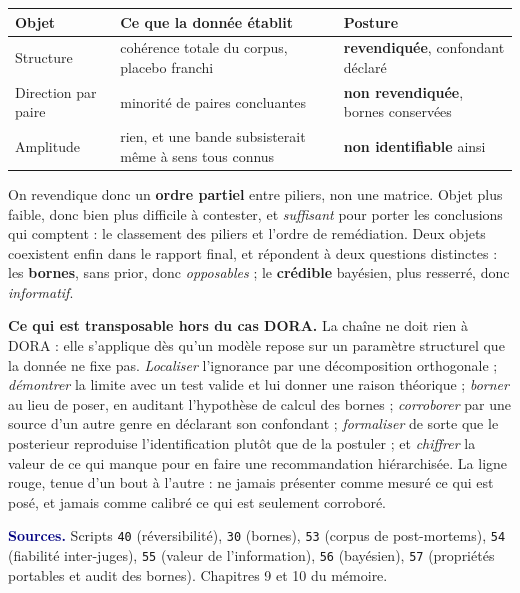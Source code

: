 \documentclass[11pt,a4paper]{article}
\begin{document}
\begin{center}\small
\renewcommand{\arraystretch}{1.25}
\begin{tabular}{@{}p{3.0cm} p{6.9cm} p{4.6cm}@{}}
\toprule
\textbf{Objet} & \textbf{Ce que la donnée établit} & \textbf{Posture} \\
\midrule
Structure & cohérence totale du corpus, placebo franchi & \textbf{revendiquée}, confondant déclaré \\
Direction par paire & minorité de paires concluantes & \textbf{non revendiquée}, bornes conservées \\
Amplitude & rien, et une bande subsisterait même à sens tous connus & \textbf{non identifiable} ainsi \\
\bottomrule
\end{tabular}
\end{center}

\vspace{2pt}
On revendique donc un \textbf{ordre partiel} entre piliers, non une matrice. Objet plus faible,
donc bien plus difficile à contester, et \emph{suffisant} pour porter les conclusions qui
comptent : le classement des piliers et l'ordre de remédiation. Deux objets coexistent enfin dans
le rapport final, et répondent à deux questions distinctes : les \textbf{bornes}, sans prior, donc
\emph{opposables} ; le \textbf{crédible} bayésien, plus resserré, donc \emph{informatif}.

\begin{cle}
\textbf{Ce qui est transposable hors du cas DORA.} La chaîne ne doit rien à DORA : elle
s'applique dès qu'un modèle repose sur un paramètre structurel que la donnée ne fixe pas.
\emph{Localiser} l'ignorance par une décomposition orthogonale ; \emph{démontrer} la limite avec
un test valide et lui donner une raison théorique ; \emph{borner} au lieu de poser, en auditant
l'hypothèse de calcul des bornes ; \emph{corroborer} par une source d'un autre genre en déclarant
son confondant ; \emph{formaliser} de sorte que le posterieur reproduise l'identification plutôt
que de la postuler ; et \emph{chiffrer} la valeur de ce qui manque pour en faire une
recommandation hiérarchisée. La ligne rouge, tenue d'un bout à l'autre : ne jamais présenter comme
mesuré ce qui est posé, et jamais comme calibré ce qui est seulement corroboré.
\end{cle}

\smallskip
{\footnotesize\textcolor{navy}{\textbf{Sources.}} Scripts \texttt{40} (réversibilité),
\texttt{30} (bornes), \texttt{53} (corpus de post-mortems), \texttt{54} (fiabilité inter-juges),
\texttt{55} (valeur de l'information), \texttt{56} (bayésien), \texttt{57} (propriétés portables
et audit des bornes). Chapitres 9 et 10 du mémoire.}
\end{document}
